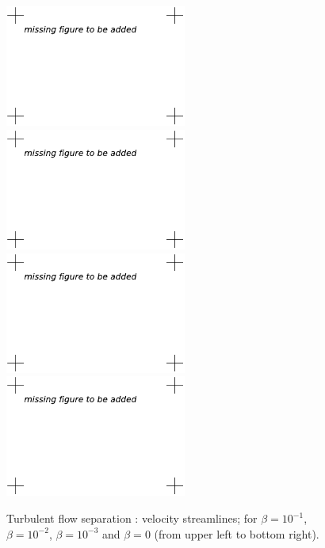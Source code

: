 \begin{figure}
\centering
\includegraphics[height=4cm]{chapters/hoffman-1/pdf/Hoffman_fig5a.pdf}
\includegraphics[height=4cm]{chapters/hoffman-1/pdf/Hoffman_fig5b.pdf}
\includegraphics[height=4cm]{chapters/hoffman-1/pdf/Hoffman_fig5c.pdf}
\includegraphics[height=4cm]{chapters/hoffman-1/pdf/Hoffman_fig5d.pdf}
\caption{Turbulent flow separation \cite{JanssonHoffman2009}: velocity streamlines; for $\beta = 10^{-1}$, $\beta = 10^{-2}$, $\beta = 10^{-3}$ and $\beta = 0$ (from upper left to bottom right).}
\label{fig:3}
\end{figure}

